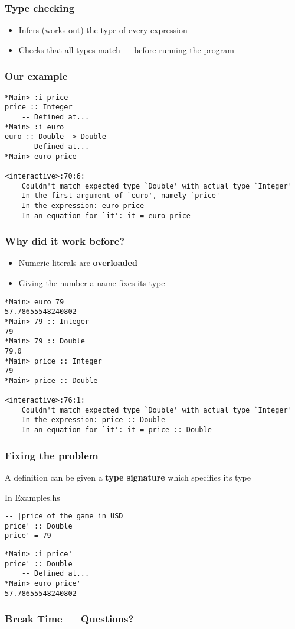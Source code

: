 \documentclass{beamer}
\begin{document}
\begin{frame}
  \frametitle{Type checking}
  \begin{itemize}
  \item  Infers (works out) the type of every expression 
  \item  Checks that all types match --- before running the program
  \end{itemize}
\end{frame}
\begin{frame}[fragile]
  \frametitle{Our example}
\begin{verbatim}
*Main> :i price
price :: Integer
  	-- Defined at...
*Main> :i euro
euro :: Double -> Double
  	-- Defined at...
*Main> euro price

<interactive>:70:6:
    Couldn't match expected type `Double' with actual type `Integer'
    In the first argument of `euro', namely `price'
    In the expression: euro price
    In an equation for `it': it = euro price
\end{verbatim}
\end{frame}
\begin{frame}[fragile]
  \frametitle{Why did it work before?}
  \begin{itemize}
  \item Numeric literals are \textbf{overloaded}
  \item  Giving the number a name fixes its type
  \end{itemize}
\begin{verbatim}
*Main> euro 79
57.78655548240802
*Main> 79 :: Integer
79
*Main> 79 :: Double
79.0
*Main> price :: Integer
79
*Main> price :: Double

<interactive>:76:1:
    Couldn't match expected type `Double' with actual type `Integer'
    In the expression: price :: Double
    In an equation for `it': it = price :: Double
\end{verbatim}
\end{frame}
\begin{frame}[fragile]
  \frametitle{Fixing the problem}
  A definition can be given a \textbf{type signature} which specifies
  its type
\begin{block}{In Examples.hs}
\begin{verbatim}
-- |price of the game in USD
price' :: Double
price' = 79
\end{verbatim}
  \end{block}
\begin{verbatim}
*Main> :i price'
price' :: Double
  	-- Defined at...
*Main> euro price'
57.78655548240802
\end{verbatim}
\end{frame}


\begin{frame}
  \frametitle{Break Time --- Questions?}
  \begin{center}
  \end{center}
\end{frame}
\end{document}
